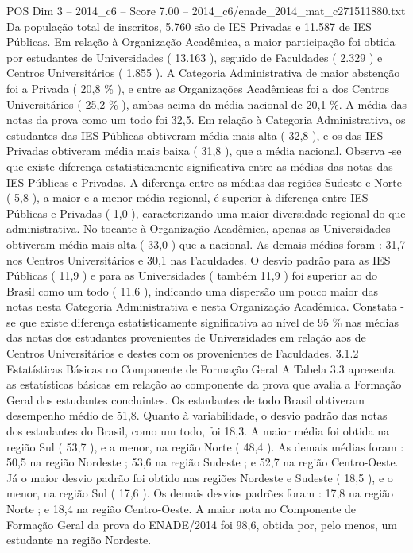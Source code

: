 \begin{textsample}{POS Dim 3 – 2014\_c6 – Score 7.00 – 2014\_c6/enade\_2014\_mat\_c271511880.txt}
Da população total de inscritos, 5.760 são de IES Privadas e 11.587 de IES Públicas.
Em relação à Organização Acadêmica, a maior participação foi obtida por estudantes de Universidades ( 13.163 ), seguido de Faculdades ( 2.329 ) e Centros Universitários ( 1.855 ).
A Categoria Administrativa de maior abstenção foi a Privada ( 20,8 \% ), e entre as Organizações Acadêmicas foi a dos Centros Universitários ( 25,2 \% ), ambas acima da média nacional de 20,1 \%.
A média das notas da prova como um todo foi 32,5.
Em relação à Categoria Administrativa, os estudantes das IES Públicas obtiveram média mais alta ( 32,8 ), e os das IES Privadas obtiveram média mais baixa ( 31,8 ), que a média nacional.
Observa -se que existe diferença estatisticamente significativa entre as médias das notas das IES Públicas e Privadas.
A diferença entre as médias das regiões Sudeste e Norte ( 5,8 ), a maior e a menor média regional, é superior à diferença entre IES Públicas e Privadas ( 1,0 ), caracterizando uma maior diversidade regional do que administrativa.
No tocante à Organização Acadêmica, apenas as Universidades obtiveram média mais alta ( 33,0 ) que a nacional.
As demais médias foram : 31,7 nos Centros Universitários e 30,1 nas Faculdades.
O desvio padrão para as IES Públicas ( 11,9 ) e para as Universidades ( também 11,9 ) foi superior ao do Brasil como um todo ( 11,6 ), indicando uma dispersão um pouco maior das notas nesta Categoria Administrativa e nesta Organização Acadêmica.
Constata -se que existe diferença estatisticamente significativa ao nível de 95 \% nas médias das notas dos estudantes provenientes de Universidades em relação aos de Centros Universitários e destes com os provenientes de Faculdades. 3.1.2 Estatísticas Básicas no Componente de Formação Geral A Tabela 3.3 apresenta as estatísticas básicas em relação ao componente da prova que avalia a Formação Geral dos estudantes concluintes.
Os estudantes de todo Brasil obtiveram desempenho médio de 51,8.
Quanto à variabilidade, o desvio padrão das notas dos estudantes do Brasil, como um todo, foi 18,3.
A maior média foi obtida na região Sul ( 53,7 ), e a menor, na região Norte ( 48,4 ).
As demais médias foram : 50,5 na região Nordeste ; 53,6 na região Sudeste ; e 52,7 na região Centro-Oeste.
Já o maior desvio padrão foi obtido nas regiões Nordeste e Sudeste ( 18,5 ), e o menor, na região Sul ( 17,6 ).
Os demais desvios padrões foram : 17,8 na região Norte ; e 18,4 na região Centro-Oeste.
A maior nota no Componente de Formação Geral da prova do ENADE/2014 foi 98,6, obtida por, pelo menos, um estudante na região Nordeste.

\end{textsample}
